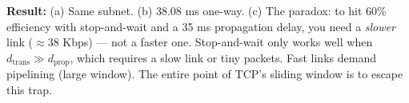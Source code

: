 \documentclass[11pt, letterpaper]{article}
\begin{document}
\begin{tcolorbox}[colback=part3bg, colframe=sectionpurple, arc=3pt, boxrule=1pt]
\textbf{Result:} (a) Same subnet. (b) 38.08 ms one-way. (c) The paradox:
to hit 60\% efficiency with stop-and-wait and a 35 ms propagation delay, you need a
\emph{slower} link ($\approx$38 Kbps) --- not a faster one. Stop-and-wait only works
well when $d_{\text{trans}} \gg d_{\text{prop}}$, which requires a slow link or tiny
packets. Fast links demand pipelining (large window). The entire point of TCP's sliding
window is to escape this trap.
\end{tcolorbox}
\end{document}
